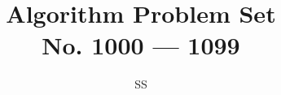 \documentclass[a4paper,12pt]{article}
\title{Algorithm Problem Set \\ \large No. 1000 --- 1099}
\author{SS}
\begin{document}
\def\bottom#1#2{\hbox{\vbox to #1{\vfill\hbox{#2}}}}
\renewcommand{\thelstlisting}{\thesection.\arabic{lstlisting}}
\sloppy
\maketitle

%
%
%
%
%
%
%
%
%
%
%
%
%
%
%
%
%
%
%
%
%
%
%
%
%
%
%
%
%
%
%
%
%
%
%
%
%
%
%
%
%
%

%
%
%
%
%
%
%
%
%
%
%
%
%
%
%
%
%
%
%
%
%
%
%
%
%
%
%
%
%
%
%
%
%
%
%
%
%
%
%
%
%
%
%
%
%
%
%
%
%
%
%
%
%
%
%
%
\end{document}
